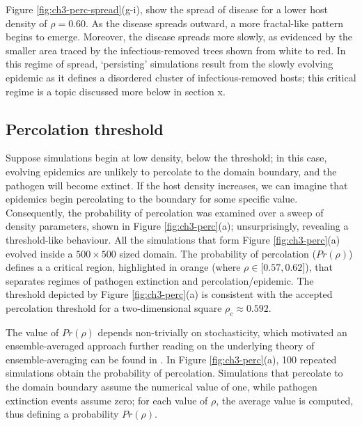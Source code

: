 Figure \ref{fig:ch3-perc-spread}(g-i), show the spread of disease for a lower host density of $\rho = 0.60$.
As the disease spreads outward, a more fractal-like pattern begins to emerge.
Moreover, the disease spreads more slowly, as evidenced by the smaller area traced by the infectious-removed trees shown from white to red.
In this regime of spread, `persisting' simulations result from the slowly evolving epidemic as it defines a disordered cluster of infectious-removed hosts;
this critical regime is a topic discussed more below in section x.
\newpage

\subsection{Percolation threshold}
\label{section:universality}

Suppose simulations begin at low density, below the threshold; in this case, evolving epidemics are unlikely to percolate to the domain boundary, and the pathogen will become extinct.
If the host density increases, we can imagine that epidemics begin percolating to the boundary for some specific value.
Consequently, the probability of percolation was examined over a sweep of density parameters, shown in Figure \ref{fig:ch3-perc}(a);
unsurprisingly, revealing a threshold-like behaviour.
All the simulations that form Figure \ref{fig:ch3-perc}(a) evolved inside a $500\times 500$ sized domain.
The probability of percolation ($Pr(\rho)$) defines a
a critical region, highlighted in orange (where $ \rho \in [0.57, 0.62$]), that separates regimes of pathogen extinction and percolation/epidemic.
The threshold depicted by Figure \ref{fig:ch3-perc}(a) is consistent with the accepted percolation threshold for a two-dimensional square $\rho_c \approx 0.592$.

The value of $Pr(\rho)$ depends non-trivially on stochasticity, which motivated an ensemble-averaged approach\textemdash 
further reading on the underlying theory of ensemble-averaging can be found in \cite{gibbs1902elementary}.
In Figure \ref{fig:ch3-perc}(a), 100 repeated simulations obtain the probability of percolation. Simulations that percolate to the domain boundary assume the numerical value of one, while pathogen extinction events assume zero; for each value of $\rho$, the average value is computed, thus defining a probability $Pr(\rho)$.

